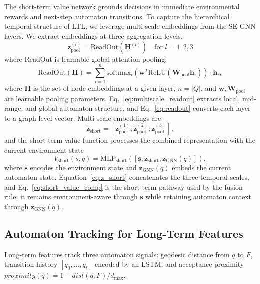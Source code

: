 \documentclass[conference]{IEEEtran}
\begin{document}
The short-term value network grounds decisions in immediate environmental rewards and next-step automaton transitions. To capture the hierarchical temporal structure of LTL, we leverage multi-scale embeddings from the SE-GNN layers.
We extract embeddings at three aggregation levels,
\begin{equation}
\mathbf{z}^{(l)}_{\text{pool}} = \text{ReadOut}(\mathbf{H}^{(l)}) \quad \text{for } l = 1, 2, 3
\label{eq:multiscale_readout}
\end{equation}
where ReadOut is learnable global attention pooling:
\begin{equation}
\label{eq:readout}
	\text{ReadOut}(\mathbf{H}) = \sum_{i=1}^{n} \text{softmax}_i(\mathbf{w}^T \text{ReLU}(\mathbf{W}_{\text{pool}} \mathbf{h}_i)) \cdot \mathbf{h}_i,
\end{equation}
where $\mathbf{H}$ is the set of node embeddings at a given layer, $n=|Q|$, and $\mathbf{w},\mathbf{W}_{\text{pool}}$ are learnable pooling parameters. Eq.~\ref{eq:multiscale_readout} extracts local, mid-range, and global automaton structure, and Eq.~\ref{eq:readout} converts each layer to a graph-level vector. Multi-scale embeddings are
\begin{equation}
\mathbf{z}_{\text{short}} = [\mathbf{z}_{\text{pool}}^{(1)}; \mathbf{z}_{\text{pool}}^{(2)}; \mathbf{z}_{\text{pool}}^{(3)}],
\label{eq:z_short}
\end{equation}
and the short-term value function processes the combined representation with the current environment state
\begin{equation}
V_{\text{short}}(s, q) = \text{MLP}_{\text{short}}([\mathbf{s}, \mathbf{z}_{\text{short}}, \mathbf{z}_{\text{GNN}}(q)]),
\label{eq:short_value_comp}
\end{equation}
where $\mathbf{s}$ encodes the environment state and $\mathbf{z}_{\text{GNN}}(q)$ embeds the current automaton state.
Equation~\ref{eq:z_short} concatenates the three temporal scales, and Eq.~\ref{eq:short_value_comp} is the short-term pathway used by the fusion rule; it remains environment-aware through $\mathbf{s}$ while retaining automaton context through $\mathbf{z}_{\text{GNN}}(q)$.

\subsection{Automaton Tracking for Long-Term Features}

Long-term features track three automaton signals: geodesic distance from $q$ to $F$, transition history $[q_0,\ldots,q_t]$ encoded by an LSTM, and acceptance proximity $\textit{proximity}(q)=1-{\textit{dist}(q,F)}/{d_{\max}}$.
\end{document}

